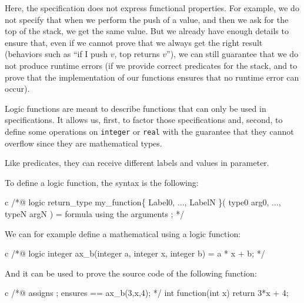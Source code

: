 \documentclass[middle]{zmdocument}
\begin{document}
Here, the specification does not express functional properties. For
example, we do not specify that when we perform the push of a value, and
then we ask for the top of the stack, we get the same value. But we
already have enough details to ensure that, even if we cannot prove that
we always get the right result (behaviors such as ``if I push \(v\), top
returns \(v\)''), we can still guarantee that we do not produce runtime
errors (if we provide correct predicates for the stack, and to prove
that the implementation of our functions ensures that no runtime error
can occur).





Logic functions are meant to describe functions that can only be used in
specifications. It allows us, first, to factor those specifications and,
second, to define some operations on \texttt{integer} or \texttt{real}
with the guarantee that they cannot overflow since they are mathematical
types.

Like predicates, they can receive different labels and values in
parameter.





To define a logic function, the syntax is the following:



\begin{CodeBlock}{c}
/*@
  logic return_type my_function\{ Label0, ..., LabelN \}( type0 arg0, ..., typeN argN ) =
    formula using the arguments ;
*/
\end{CodeBlock}



We can for example define a mathematical  using a logic function:



\begin{CodeBlock}{c}
/*@
  logic integer ax_b(integer a, integer x, integer b) =
    a * x + b;
*/
\end{CodeBlock}



And it can be used to prove the source code of the following function:



\begin{CodeBlock}{c}
/*@ 
  assigns \nothing ;
  ensures \result == ax_b(3,x,4); 
*/
int function(int x){
  return 3*x + 4;
}
\end{CodeBlock}
\end{document}
